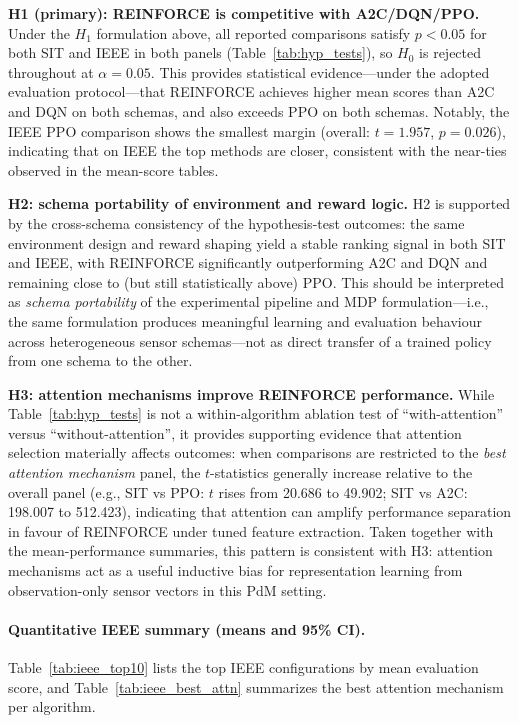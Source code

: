 \documentclass[sn-basic]{sn-jnl} %
\begin{document}
\textbf{H1 (primary): \textsc{REINFORCE} is competitive with A2C/DQN/PPO.}
Under the $H_1$ formulation above, all reported comparisons satisfy $p<0.05$ for both SIT and IEEE in both panels (Table~\ref{tab:hyp_tests}), so $H_0$ is rejected throughout at $\alpha=0.05$. This provides statistical evidence---under the adopted evaluation protocol---that \textsc{REINFORCE} achieves higher mean  scores than \textsc{A2C} and \textsc{DQN} on both schemas, and also exceeds \textsc{PPO} on both schemas. Notably, the IEEE \textsc{PPO} comparison shows the smallest margin (overall: $t=1.957$, $p=0.026$), indicating that on IEEE the top methods are closer, consistent with the near-ties observed in the mean-score tables.

\textbf{H2: schema portability of environment and reward logic.}
H2 is supported by the cross-schema consistency of the hypothesis-test outcomes: the same environment design and reward shaping yield a stable ranking signal in both SIT and IEEE, with \textsc{REINFORCE} significantly outperforming \textsc{A2C} and \textsc{DQN} and remaining close to (but still statistically above) \textsc{PPO}. This should be interpreted as \emph{schema portability} of the experimental pipeline and MDP formulation---i.e., the same formulation produces meaningful learning and evaluation behaviour across heterogeneous sensor schemas---not as direct transfer of a trained policy from one schema to the other.

\textbf{H3: attention mechanisms improve \textsc{REINFORCE} performance.}
While Table~\ref{tab:hyp_tests} is not a within-algorithm ablation test of ``with-attention'' versus ``without-attention'', it provides supporting evidence that attention selection materially affects outcomes: when comparisons are restricted to the \emph{best attention mechanism} panel, the $t$-statistics generally increase relative to the overall panel (e.g., SIT vs \textsc{PPO}: $t$ rises from 20.686 to 49.902; SIT vs \textsc{A2C}: 198.007 to 512.423), indicating that attention can amplify performance separation in favour of \textsc{REINFORCE} under tuned feature extraction. Taken together with the mean-performance summaries, this pattern is consistent with H3: attention mechanisms act as a useful inductive bias for representation learning from observation-only sensor vectors in this PdM setting.

\paragraph{Quantitative IEEE summary (means and 95\% CI).}
Table~\ref{tab:ieee_top10} lists the top IEEE configurations by mean evaluation score, and Table~\ref{tab:ieee_best_attn} summarizes the best attention mechanism per algorithm.
\end{document}
